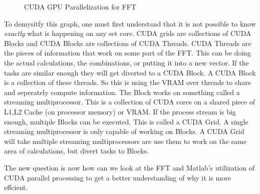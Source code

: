 \documentclass{article}
\begin{document}
    \begin{figure}[h]
    \centering
        \caption{CUDA GPU Parallelization for FFT}
    \end{figure}
    \begin{sloppypar}
        \indent{}To demysitfy this graph, one must first understand that it is not possible to know \emph{exactly} what is happening on any set core. CUDA grids are collections of CUDA Blocks and CUDA Blocks are collections of CUDA Threads. CUDA Threads
        are the pieces of information that work on some part of the FFT. This can be doing the actual calculations, the combinations, or putting it into a new vector. If the tasks are similar enough they will get diverted to a CUDA Block. A CUDA Block is a collection of these threads. So this is 
        using the VRAM over threads to share and seperately compute information. The Block works on something called a streaming multiprocessor. This is a collection of CUDA cores on a shared piece of L1,L2 Cache (on processor memory) or VRAM. If the process stream is big enough, multiple Blocks can be executed.
        This is called a CUDA Grid. A single streaming multiprocessor is only capable of working on Blocks. A CUDA Grid will take multiple streaming multiprocessors are use them to work on the same area of calculations, but divert tasks to Blocks. 
    \end{sloppypar}
    \begin{sloppypar}
        \indent{} The new question is now how can we look at the FFT and Matlab's utilization of CUDA parallel processing to get a better understanding of why it is more effcient.
    \end{sloppypar}
\end{document}
